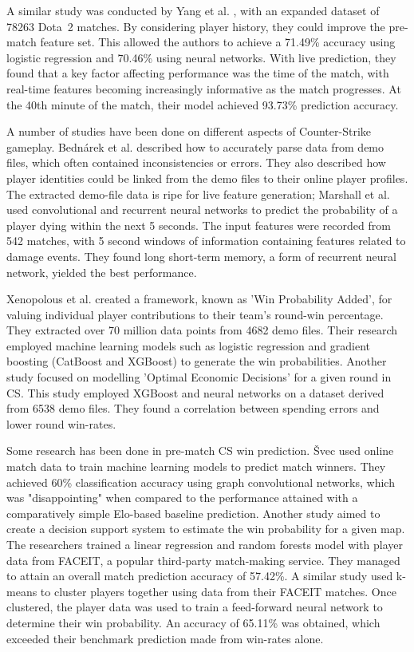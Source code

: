 A similar study was conducted by Yang et al. \cite{yang2016realtime}, with an expanded dataset of 78263 Dota~2 matches. By considering player history, they could improve the pre-match feature set. This allowed the authors to achieve a 71.49\% accuracy using logistic regression and 70.46\% using neural networks. With live prediction, they found that a key factor affecting performance was the time of the match, with real-time features becoming increasingly informative as the match progresses. At the 40th minute of the match, their model achieved 93.73\% prediction accuracy.

A number of studies have been done on different aspects of Counter-Strike gameplay. Bednárek et al. \cite{demofileprocessing} described how to accurately parse data from demo files, which often contained inconsistencies or errors. They also described how player identities could be linked from the demo files to their online player profiles. The extracted demo-file data is ripe for live feature generation; Marshall et al. \cite{livedeaths} used convolutional and recurrent neural networks to predict the probability of a player dying within the next 5 seconds. The input features were recorded from 542 matches, with 5 second windows of information containing features related to damage events. They found long short-term memory, a form of recurrent neural network, yielded the best performance.

Xenopolous et al. \cite{wpacs} created a framework, known as 'Win Probability Added', for valuing individual player contributions to their team's round-win percentage. They extracted over 70 million data points from 4682 demo files. Their research employed machine learning models such as logistic regression and gradient boosting (CatBoost and XGBoost) to generate the win probabilities. Another study \cite{spendingerror} focused on modelling 'Optimal Economic Decisions' for a given round in CS. This study employed XGBoost and neural networks on a dataset derived from 6538 demo files. They found a correlation between spending errors and lower round win-rates.

Some research has been done in pre-match CS win prediction. Švec \cite{svec} used online match data to train machine learning models to predict match winners. They achieved 60\% classification accuracy using graph convolutional networks, which was "disappointing" when compared to the performance attained with a comparatively simple Elo-based baseline prediction. Another study \cite{mapvetoml} aimed to create a decision support system to estimate the win probability for a given map. The researchers trained a linear regression and random forests model with player data from FACEIT, a popular third-party match-making service. They managed to attain an overall match prediction accuracy of 57.42\%. A similar study \cite{faceitclusters} used k-means to cluster players together using data from their FACEIT matches. Once clustered, the player data was used to train a feed-forward neural network to determine their win probability. An accuracy of 65.11\% was obtained, which exceeded their benchmark prediction made from win-rates alone.

